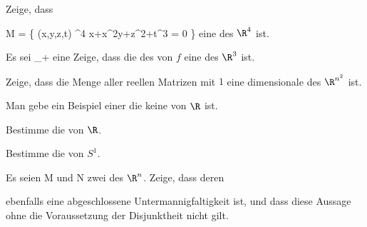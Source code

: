 \setcounter{section}{10}


{}
{

Zeige, dass

\mavergleichskettedisp
{\vergleichskette
{M
}
{ =} { \left\{ (x,y,z,t) \in \R^4  \mid   x+x^2y+z^2+t^3 = 0         \right\}
}
{ } {
}
{ } {
}
{ } {
}
}
{}{}{}
eine
des $\R^4$ ist.

}
{} {}

{}
{

Es sei
 {\R} {\R_+
} {}
eine
Zeige, dass die
des
von $f$ eine
des $\R^{3}$ ist.

}
{} {}

{}
{

Zeige, dass die Menge aller reellen
Matrizen mit
$1$ eine
dimensionale
des $\R^{n^2}$ ist.

}
{} {}

{}
{

Man gebe ein Beispiel einer
 die keine
 von $\R$ ist.

}
{} {}

{}
{

Bestimme die
von $\R$.

}
{} {}

{}
{

Bestimme die
von $S^1$.

}
{} {}

{}
{

Es seien
\mathkor {} {M} {und} {N} {}
zwei
des $\R^n$. Zeige, dass deren

 ebenfalls eine abgeschlossene Untermannigfaltigkeit ist, und dass diese Aussage ohne die Voraussetzung der Disjunktheit nicht gilt.

}
{} {}

